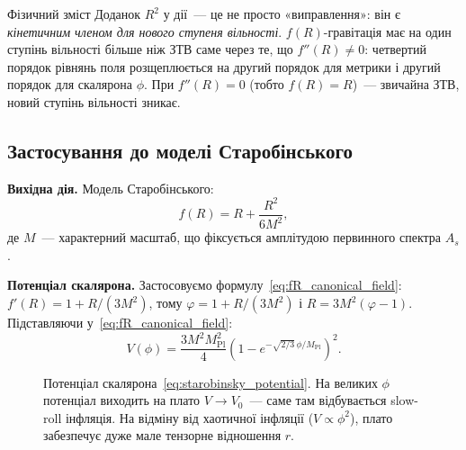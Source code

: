 \begin{keybox}{Фізичний зміст}
Доданок $R^2$ у дії~--- це не просто «виправлення»:
він є \emph{кінетичним членом для нового ступеня вільності}.
$f(R)$-гравітація має на один ступінь вільності більше ніж ЗТВ
саме через те, що $f''(R)\neq 0$: четвертий порядок рівнянь поля
розщеплюється на другий порядок для метрики і другий порядок
для скалярона $\phi$.
При $f''(R) = 0$ (тобто $f(R) = R$)~--- звичайна ЗТВ,
новий ступінь вільності зникає.
\end{keybox}

\subsection*{Застосування до моделі Старобінського}

\textbf{Вихідна дія.} Модель Старобінського:
\begin{equation}\label{eq:starobinsky_action}
  f(R) = R + \frac{R^2}{6M^2},
\end{equation}
де $M$~--- характерний масштаб, що фіксується амплітудою первинного
спектра $A_s$.

\textbf{Потенціал скалярона.}
Застосовуємо формулу~\eqref{eq:fR_canonical_field}:
$f'(R) = 1 + R/(3M^2)$, тому
$\varphi = 1 + R/(3M^2)$ і $R = 3M^2(\varphi-1)$.
Підставляючи у~\eqref{eq:fR_canonical_field}:
\begin{equation}\label{eq:starobinsky_potential}
  V(\phi) = \frac{3M^2 M_\mathrm{Pl}^2}{4}
            \left(1 - e^{-\sqrt{2/3}\,\phi/M_\mathrm{Pl}}\right)^2.
\end{equation}

\begin{figure}[h!]
\centering
{}
\caption{Потенціал скалярона~\eqref{eq:starobinsky_potential}.
На великих $\phi$ потенціал виходить на плато $V\to V_0$~---
саме там відбувається slow-roll інфляція. На відміну від хаотичної
інфляції ($V\propto\phi^2$), плато забезпечує дуже мале тензорне
відношення $r$.}
\end{figure}

